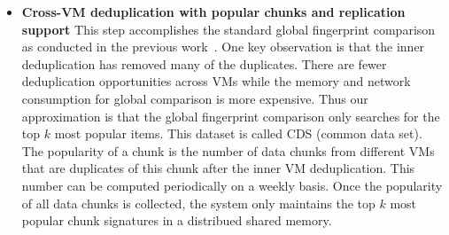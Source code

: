 \begin{itemize}
%

%

\item \textbf{Cross-VM deduplication with popular chunks and replication support}
This step accomplishes the standard global fingerprint  comparison as conducted
in the previous work~\cite{??}.
One key observation is that the inner deduplication has removed many of the duplicates.
There are fewer deduplication opportunities across VMs while the memory and network
consumption for global comparison is more expensive.
Thus our approximation is that the global fingerprint comparison only searches for the top $k$
most popular items. This dataset is called CDS (common data set). 
The popularity of a chunk is the number  of data chunks  from different VMs
that are duplicates of this chunk after the inner VM deduplication.
This number can be computed periodically on a weekly basis.
Once the popularity of all data chunks is collected, the system only maintains the top $k$
most popular chunk signatures in a distribued shared memory.  


\end{itemize}
